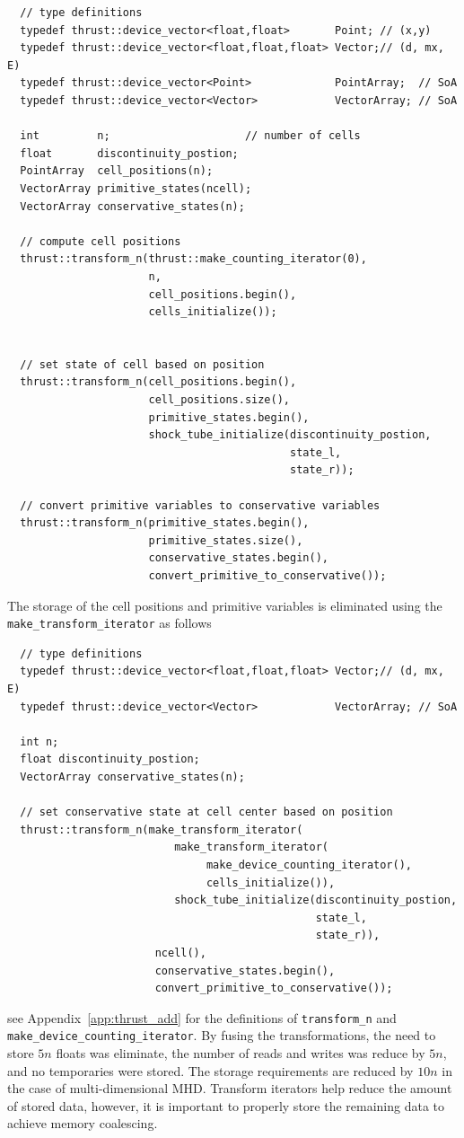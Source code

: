 \begin{lstlisting}
  // type definitions
  typedef thrust::device_vector<float,float>       Point; // (x,y)
  typedef thrust::device_vector<float,float,float> Vector;// (d, mx, E)
  typedef thrust::device_vector<Point>             PointArray;  // SoA
  typedef thrust::device_vector<Vector>            VectorArray; // SoA

  int         n;                     // number of cells
  float       discontinuity_postion;
  PointArray  cell_positions(n);
  VectorArray primitive_states(ncell);
  VectorArray conservative_states(n);

  // compute cell positions 
  thrust::transform_n(thrust::make_counting_iterator(0),
                      n,
                      cell_positions.begin(),
                      cells_initialize());
  			  
  
  // set state of cell based on position                 
  thrust::transform_n(cell_positions.begin(),
                      cell_positions.size(),
                      primitive_states.begin(),
                      shock_tube_initialize(discontinuity_postion,
                                            state_l,
                                            state_r));

  // convert primitive variables to conservative variables
  thrust::transform_n(primitive_states.begin(),
                      primitive_states.size(),
                      conservative_states.begin(),
                      convert_primitive_to_conservative());
\end{lstlisting}
The storage of the cell positions and primitive variables is eliminated using the \verb+make_transform_iterator+ as follows 
\begin{lstlisting}
  // type definitions
  typedef thrust::device_vector<float,float,float> Vector;// (d, mx, E)
  typedef thrust::device_vector<Vector>            VectorArray; // SoA

  int n;
  float discontinuity_postion;
  VectorArray conservative_states(n);

  // set conservative state at cell center based on position
  thrust::transform_n(make_transform_iterator(
                          make_transform_iterator(
                               make_device_counting_iterator(),
                               cells_initialize()),
                          shock_tube_initialize(discontinuity_postion,
                                                state_l,
                                                state_r)),
                       ncell(),
                       conservative_states.begin(),
                       convert_primitive_to_conservative());
\end{lstlisting}
see Appendix~\ref{app:thrust_add} for the definitions of \verb+transform_n+ and \verb+make_device_counting_iterator+.  By fusing the transformations, the need to store $5n$ floats was eliminate, the number of reads and writes was reduce by $5n$, and no temporaries were stored.  The storage requirements are reduced by $10n$ in the case of multi-dimensional MHD.  Transform iterators help reduce the amount of stored data, however, it is important to properly store the remaining data to achieve memory coalescing.

